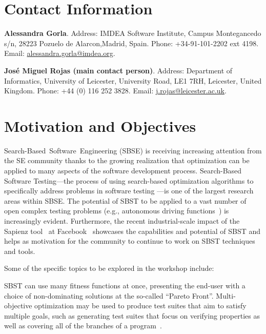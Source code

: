 \documentclass[10pt,conference]{IEEEtran}
\newcommand{\subheading}[1]{\vspace{1mm} \noindent {\bf #1}}
\begin{document}

\section{Contact Information}
\textbf{Alessandra Gorla}. Address: IMDEA Software Institute, Campus
Montegancedo s/n, 28223 Pozuelo de Alarcon,Madrid, Spain. Phone:
+34-91-101-2202 ext 4198. Email: \url{alessandra.gorla@imdea.org}.

\textbf{Jos\'e Miguel Rojas (main contact person)}. Address:
Department of Informatics, University of Leicester, University Road,
LE1 7RH, Leicester, United Kingdom. Phone: +44 (0) 116 252
3828. Email: \url{j.rojas@leicester.ac.uk}.

\section{Motivation and Objectives}
\label{sec:themes}
  
Search-Based~Software~Engineering (SBSE) \cite{mhbj:manifesto} is
receiving increasing attention from the SE community thanks to the
growing realization that optimization can be applied to many aspects
of the software development process.  Search-Based Software
Testing---the process of using search-based optimization algorithms to
specifically address problems in software testing
\cite{mcminn:survey}---is one of the largest research areas within
SBSE. The potential of SBST to be applied to a vast number of open
complex testing problems (e.g., autonomous driving
functions~\cite{Abdessalem2018}) is increasingly evident. Furthermore,
the recent industrial-scale impact of the Sapienz tool~\cite{Sapienz}
at Facebook~\cite{SapienzFB} showcases the capabilities and potential
of SBST and helps as motivation for the community to continue to work
on SBST techniques and tools.

\noindent Some of the specific topics to be explored in the workshop
include:
	
\subheading{Multi-Objective Solutions.}  SBST can use many fitness
functions at once, presenting the end-user with a choice of
non-dominating solutions at the so-called ``Pareto Front''.
Multi-objective optimization may be used to produce test suites that
aim to satisfy multiple goals, such as generating test suites that
focus on verifying properties as well as covering all of the branches
of a program~\cite{Gay14:risks}.
\end{document}
